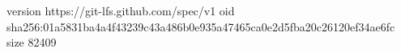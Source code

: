 version https://git-lfs.github.com/spec/v1
oid sha256:01a5831ba4a4f43239c43a486b0e935a47465ca0e2d5fba20c26120ef34ae6fc
size 82409
